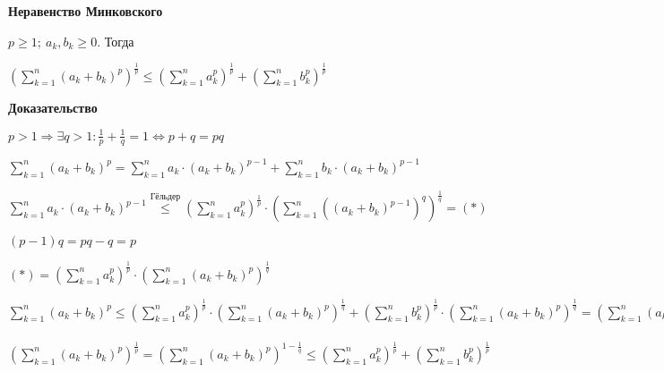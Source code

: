 \documentclass[14pt, letter paper]{article}
\begin{document}
\vspace{5mm}

\textbf{Неравенство Минковского}

$p \geq 1;\ a_k, b_k \geq 0$. Тогда

$(\sum\limits_{k = 1}^n (a_k + b_k)^p)^\frac{1}{p} \leq (\sum\limits_{k = 1}^n a_k^p)^\frac{1}{p} + (\sum\limits_{k = 1}^n b_k^p)^\frac{1}{p}$

\begin{center}
    \textbf{Доказательство}
\end{center}

$p > 1 \Rightarrow \exists q > 1 : \frac{1}{p} + \frac{1}{q} = 1 \Leftrightarrow p + q = pq$

$\sum\limits_{k = 1}^n (a_k + b_k)^p = \sum\limits_{k = 1}^n a_k \cdot (a_k + b_k)^{p - 1} + \sum\limits_{k = 1}^n b_k \cdot (a_k + b_k)^{p - 1}$

$\sum\limits_{k = 1}^n a_k \cdot (a_k + b_k)^{p - 1} \stackrel{\text{Гёльдер}}{\leq} (\sum\limits_{k = 1}^n a_k^p)^\frac{1}{p} \cdot (\sum\limits_{k = 1}^n ((a_k + b_k)^{p - 1})^q)^\frac{1}{q} = (*)$

$(p - 1)q = pq - q = p$

$(*) = (\sum\limits_{k = 1}^n a_k^p)^\frac{1}{p} \cdot (\sum\limits_{k = 1}^n (a_k + b_k)^p)^\frac{1}{q}$

$\sum\limits_{k = 1}^n (a_k + b_k)^p \leq (\sum\limits_{k = 1}^n a_k^p)^{\frac{1}{p}} \cdot (\sum\limits_{k = 1}^n (a_k + b_k)^p)^{\frac{1}{q}} + (\sum\limits_{k = 1}^n b_k^p)^{\frac{1}{p}} \cdot (\sum\limits_{k = 1}^n (a_k + b_k)^p)^{\frac{1}{q}} = (\sum\limits_{k = 1}^n (a_k + b_k)^p)^{\frac{1}{q}} \cdot ((\sum\limits_{k = 1}^n a_k^p)^{\frac{1}{p}} + (\sum\limits_{k = 1}^n b_k^p)^{\frac{1}{p}})$

$(\sum\limits_{k = 1}^n (a_k + b_k)^p)^\frac{1}{p} = (\sum\limits_{k = 1}^n (a_k + b_k)^p)^{1 - \frac{1}{q}} \leq (\sum\limits_{k = 1}^n a_k^p)^{\frac{1}{p}} + (\sum\limits_{k = 1}^n b_k^p)^{\frac{1}{p}}$
\end{document}
